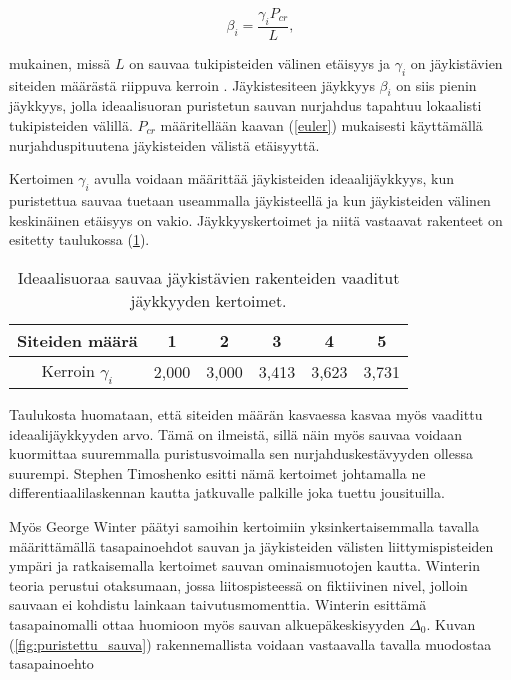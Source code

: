 \documentclass[12pt]{article}
\newenvironment{content}{\pagenumbering{arabic}}{}
\begin{document}
\begin{content}
\begin{equation}
\label{ideaalijäykkyys}
\beta_i = \frac{\gamma_i P_{cr}}{L},
\end{equation}

mukainen, missä $L$ on sauvaa tukipisteiden välinen etäisyys ja $\gamma_i$ on jäykistävien siteiden määrästä riippuva kerroin \parencite[76]{timoshenko}. Jäykistesiteen jäykkyys $\beta_i$ on siis pienin jäykkyys, jolla ideaalisuoran puristetun sauvan nurjahdus tapahtuu lokaalisti tukipisteiden välillä. $P_{cr}$ määritellään kaavan (\ref{euler}) mukaisesti käyttämällä nurjahduspituutena jäykisteiden välistä etäisyyttä. 

Kertoimen $\gamma_i$ avulla voidaan määrittää jäykisteiden ideaalijäykkyys, kun puristettua sauvaa tuetaan useammalla jäykisteellä ja kun jäykisteiden välinen keskinäinen etäisyys on vakio. Jäykkyyskertoimet ja niitä vastaavat rakenteet on esitetty taulukossa (\ref{tab:ideaalijäykkyydet}).

\begin{table}[htb]
\centering
\caption{Ideaalisuoraa sauvaa jäykistävien rakenteiden vaaditut jäykkyyden kertoimet.}
\begin{tabular}{c c c c c c}
\label{tab:ideaalijäykkyydet}

Siteiden määrä & 1 & 2 & 3 & 4 & 5   \\
\hline
Kerroin $\gamma_i$ & 2,000 &3,000 & 3,413 & 3,623 & 3,731 
\end{tabular}
\end{table}

Taulukosta huomataan, että siteiden määrän kasvaessa kasvaa myös vaadittu ideaalijäykkyyden arvo. Tämä on ilmeistä, sillä näin myös sauvaa voidaan kuormittaa suuremmalla puristusvoimalla sen nurjahduskestävyyden ollessa suurempi. Stephen Timoshenko esitti nämä kertoimet \parencite{timoshenko} johtamalla ne differentiaalilaskennan kautta jatkuvalle palkille joka tuettu jousituilla. 

Myös George Winter päätyi samoihin kertoimiin \parencite{winter} yksinkertaisemmalla tavalla määrittämällä tasapainoehdot sauvan ja jäykisteiden välisten liittymispisteiden ympäri ja ratkaisemalla kertoimet sauvan ominaismuotojen kautta. Winterin teoria perustui otaksumaan, jossa liitospisteessä on fiktiivinen nivel, jolloin sauvaan ei kohdistu lainkaan taivutusmomenttia. Winterin esittämä tasapainomalli ottaa huomioon myös sauvan alkuepäkeskisyyden $\Delta_0$. Kuvan (\ref{fig:puristettu_sauva}) rakennemallista voidaan vastaavalla tavalla muodostaa tasapainoehto


\end{content}
\end{document}
